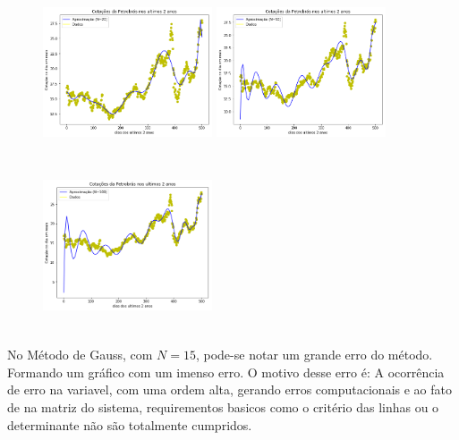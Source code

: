 \documentclass{article}
\begin{document}
\begin{figure}[!htb]
\includegraphics [width=5cm,height=5cm]{Gauss/G20.png}
\includegraphics [width=5cm,height=5cm]{Gauss/G50.png}
\includegraphics [width=5cm,height=5cm]{Gauss/G100.png}
\end{figure}

\text No Método de Gauss, com $N = 15$, pode-se notar um grande erro do método. Formando um gráfico com um imenso erro.  O motivo desse erro é: A ocorrência de erro na variavel, com uma ordem alta, gerando erros computacionais e ao fato de na matriz do sistema, requirementos basicos como o critério das linhas ou o determinante não são totalmente cumpridos.

\newpage
\end{document}
